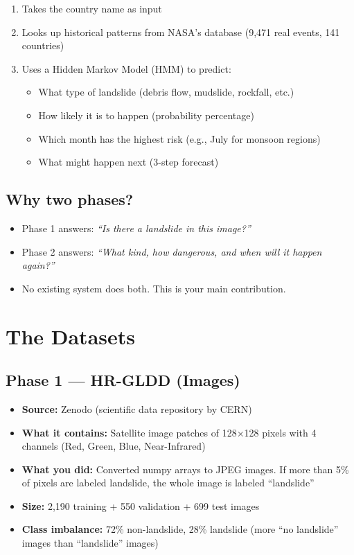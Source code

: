 \documentclass[11pt]{article}
\begin{document}
\begin{enumerate}[noitemsep]
    \item Takes the country name as input
    \item Looks up historical patterns from NASA's database (9,471 real events, 141 countries)
    \item Uses a Hidden Markov Model (HMM) to predict:
    \begin{itemize}[noitemsep]
        \item What type of landslide (debris flow, mudslide, rockfall, etc.)
        \item How likely it is to happen (probability percentage)
        \item Which month has the highest risk (e.g., July for monsoon regions)
        \item What might happen next (3-step forecast)
    \end{itemize}
\end{enumerate}

\subsection{Why two phases?}

\begin{itemize}[noitemsep]
    \item Phase 1 answers: \textit{``Is there a landslide in this image?''}
    \item Phase 2 answers: \textit{``What kind, how dangerous, and when will it happen again?''}
    \item No existing system does both. This is your main contribution.
\end{itemize}

\section{The Datasets}

\subsection{Phase 1 --- HR-GLDD (Images)}

\begin{itemize}[noitemsep]
    \item \textbf{Source:} Zenodo (scientific data repository by CERN)
    \item \textbf{What it contains:} Satellite image patches of 128$\times$128 pixels with 4 channels (Red, Green, Blue, Near-Infrared)
    \item \textbf{What you did:} Converted numpy arrays to JPEG images. If more than 5\% of pixels are labeled landslide, the whole image is labeled ``landslide''
    \item \textbf{Size:} 2,190 training + 550 validation + 699 test images
    \item \textbf{Class imbalance:} 72\% non-landslide, 28\% landslide (more ``no landslide'' images than ``landslide'' images)
\end{itemize}
\end{document}
